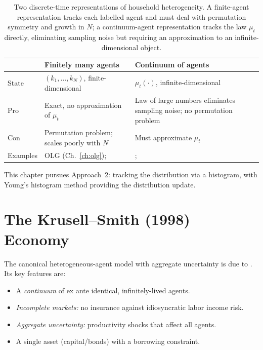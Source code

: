 \documentclass[11pt,a4paper]{report}
\begin{document}
\begin{table}[ht]
\centering
\small
\begin{tabular}{lp{5.5cm}p{5.5cm}}
\toprule
& \textbf{Finitely many agents} & \textbf{Continuum of agents} \\
\midrule
State & $(k_1,\ldots,k_N)$, finite-dimensional & $\mu_t(\cdot)$, infinite-dimensional \\
Pro & Exact, no approximation of $\mu_t$ & Law of large numbers eliminates sampling noise; no permutation problem \\
Con & Permutation problem; scales poorly with $N$ & Must approximate $\mu_t$ \\
Examples & OLG (Ch.~\ref{ch:olg}); \citet{maliarmaliarvalli2010} & \citet{krusell1998income}; \citet{young2010} \\
\bottomrule
\end{tabular}
\caption{Two discrete-time representations of household heterogeneity.  A finite-agent representation tracks each labelled agent and must deal with permutation symmetry and growth in $N$; a continuum-agent representation tracks the law $\mu_t$ directly, eliminating sampling noise but requiring an approximation to an infinite-dimensional object.}
\label{tab:finite_vs_continuum_ha}
\end{table}

This chapter pursues Approach~2: tracking the distribution via a histogram, with Young's histogram method \citep{young2010} providing the distribution update.

\section{The Krusell--Smith (1998) Economy}
\label{sec:ks_economy}

The canonical heterogeneous-agent model with aggregate uncertainty is due to \citet{krusell1998income}.  Its key features are:

\begin{itemize}[itemsep=2pt]
\item A \emph{continuum} of ex ante identical, infinitely-lived agents.
\item \emph{Incomplete markets:} no insurance against idiosyncratic labor income risk.
\item \emph{Aggregate uncertainty:} productivity shocks that affect all agents.
\item A single asset (capital/bonds) with a borrowing constraint.
\end{itemize}
\end{document}

